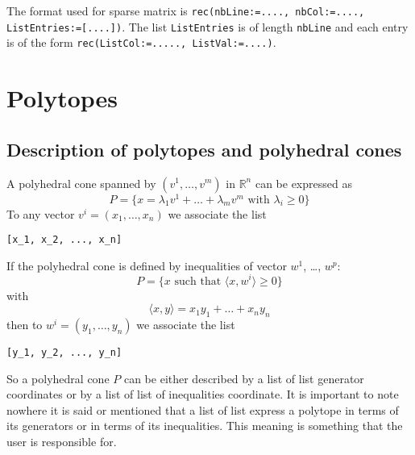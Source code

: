 \documentclass[12pt]{amsart}
\newcommand{\RR}{\ensuremath{\mathbb{R}}}
\newcommand{\ZZ}{\ensuremath{\mathbb{Z}}}
\begin{document}
The format used for sparse matrix is {\tt rec(nbLine:=...., nbCol:=...., ListEntries:=[....])}.
The list {\tt ListEntries} is of length {\tt nbLine} and each entry is of the form {\tt rec(ListCol:=....., ListVal:=....)}.







\section{Polytopes}

\subsection{Description of polytopes and polyhedral cones}

A polyhedral cone spanned by $(v^1, \dots, v^m)$ in $\RR^n$ can be expressed as
\begin{equation*}
P=\{x=\lambda_1 v^1 + \dots + \lambda_m v^m\mbox{~with~}\lambda_i\geq 0\}
\end{equation*}
To any vector $v^i=(x_1, \dots, x_n)$ we associate the list
\begin{verbatim}
[x_1, x_2, ..., x_n]
\end{verbatim}
If the polyhedral cone is defined by inequalities of vector $w^1$, \dots, $w^p$:
\begin{equation*}
P=\{x\mbox{~such~that~} \langle x, w^i\rangle \geq 0\}
\end{equation*}
with
\begin{equation*}
\langle x, y\rangle = x_1 y_1 + \dots + x_n y_n
\end{equation*}
then to $w^i=(y_1, \dots, y_n)$ we associate the list
\begin{verbatim}
[y_1, y_2, ..., y_n]
\end{verbatim}
So a polyhedral cone $P$ can be either described by a list of list generator coordinates or by a list of list of inequalities coordinate.
It is important to note nowhere it is said or mentioned that a list of list express a polytope in terms of its generators or in terms of its inequalities.
This meaning is something that the user is responsible for.
\end{document}
